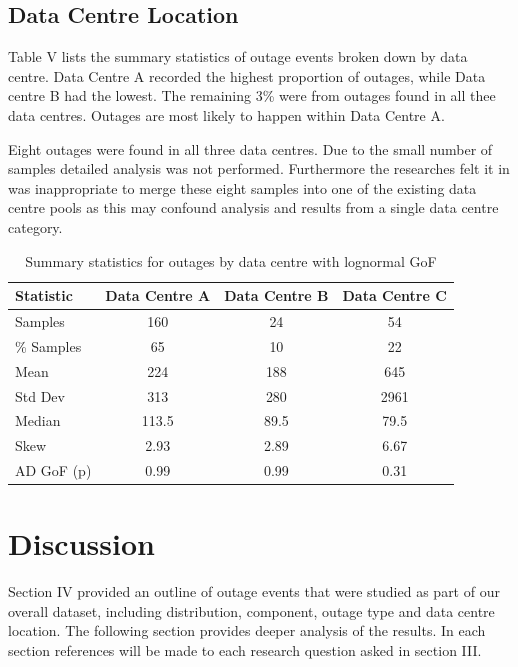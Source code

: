 \documentclass[conference]{IEEEtran}
\begin{document}
\subsection{Data Centre Location}

Table V lists the summary statistics of outage events broken down by data centre. Data Centre A recorded the highest proportion of outages, while Data centre B had the lowest. The remaining 3\% were from outages found in all thee data centres.  Outages are most likely to happen within Data Centre A.

Eight outages were found in all three data centres. Due to the small number of samples detailed analysis was not performed. Furthermore the researches felt it in was inappropriate to merge these eight samples into one of the existing data centre pools as this may confound analysis and results from a single data centre category. \par

\begin {table}
\caption {Summary statistics for outages by data centre with lognormal GoF} 
\begin{center}
\begin{tabular}{l | c | c | c} Statistic & Data Centre A & Data Centre B  & Data Centre C 
\\ \hline Samples & 160 & 24 & 54 
\\ \% Samples & 65 & 10 & 22
\\ Mean & 224	& 188 	& 645
\\ Std Dev & 313	& 280 & 2961
\\ Median & 113.5	& 89.5	& 79.5
\\ Skew & 2.93	& 2.89	& 6.67 
\\AD GoF (p) & 0.99 & 0.99 & 0.31 
\end{tabular}
\end{center}
\end{table}

\section{Discussion}

Section IV provided an outline of outage events that were studied as part of our overall dataset, including distribution, component, outage type and data centre location. The following section provides deeper analysis of the results. In each section references will be made to each research question asked in section III.
\end{document}
